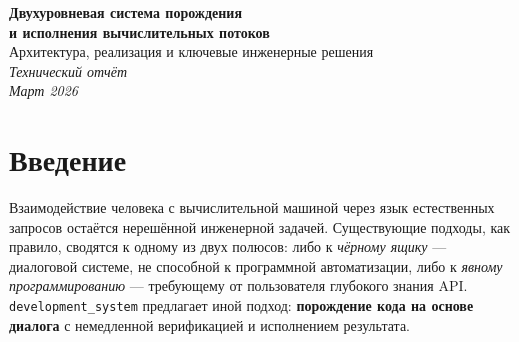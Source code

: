 \documentclass[11pt,a4paper]{article}
\newcommand{\devs}{\texttt{development\allowbreak\_\allowbreak system}}
\begin{document}
\begin{titlepage}
\vspace*{3cm}
\begin{center}
  {\LARGE\bfseries Двухуровневая система порождения\\[0.4em]
  и исполнения вычислительных потоков}\\[2em]
  {\large Архитектура, реализация и ключевые инженерные решения}\\[3em]
  {\normalsize\itshape
    Технический отчёт\\[0.5em]
    Март 2026}\\[4em]
  \begin{abstract}
    \normalsize
    В настоящей работе описана двухуровневая система \devs,
    предназначенная для интерактивного порождения и исполнения вычислительных потоков
    на основе больших языковых моделей. Система реализована в виде двух взаимодействующих
    Telegram-ботов: оркестратора~(\emph{Мастер}) на языке Racket и исполнителя
    (\emph{Подмастерье}), сочетающего Racket с Common~Lisp. Ключевой элемент системы —
    конвейер порождения: Мастер принимает от пользователя описание задачи на естественном
    языке, формирует структурированное задание, вызывает внешний агент Claude~Code,
    получает синтаксически корректный Common~Lisp, компилирует его средствами SBCL и
    сохраняет как именованный \emph{поток}. Подмастерье загружает активный поток и
    исполняет его для каждого пользовательского запроса. Описаны архитектура, протоколы
    взаимодействия компонентов, система условий и перезапуска в Common~Lisp,
    а также механизмы комбинирования потоков.
  \end{abstract}
\end{center}
\end{titlepage}

\tableofcontents
\newpage

\section{Введение}

Взаимодействие человека с вычислительной машиной через язык естественных запросов
остаётся нерешённой инженерной задачей. Существующие подходы, как правило, сводятся
к одному из двух полюсов: либо к \emph{чёрному ящику} — диалоговой системе, не
способной к программной автоматизации, либо к \emph{явному программированию} —
требующему от пользователя глубокого знания API. \devs
предлагает иной подход: \textbf{порождение кода на основе диалога} с немедленной
верификацией и исполнением результата.
\end{document}
